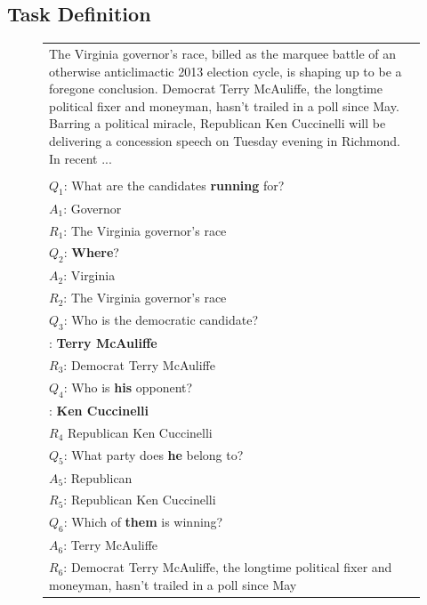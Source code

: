 \subsection{Task Definition}
\label{sec:coqa-task}

\begin{figure}[!t]
\begin{tabular}{p{\columnwidth}}
\toprule
The Virginia governor's race, billed as the marquee battle of an otherwise anticlimactic 2013 election cycle, is shaping up to be a foregone conclusion. Democrat Terry McAuliffe, the longtime political fixer and moneyman, hasn't trailed in a poll since May. Barring a political miracle, Republican Ken Cuccinelli will be delivering a concession speech on Tuesday evening in Richmond. In recent ...\\
\\
$Q_1$:               What are the candidates {\bf \color{magenta} running} for?\\
$A_1$:               Governor\\
$R_1$: The Virginia governor's race\\
\vspace{0em}
$Q_2$:               {\bf \color{magenta} Where}?\\
$A_2$:               Virginia \\
$R_2$: The Virginia governor's race\\
\vspace{0em}
$Q_3$:               Who is the democratic candidate?\\
\vspace{-0.6em}{\bf \color{blue} A$_3$}:               {\bf \color{orange} Terry McAuliffe} \\
$R_3$: Democrat Terry McAuliffe\\
\vspace{0em}
$Q_4$:               Who is {\bf \color{orange} his} opponent?\\
\vspace{-0.6em}{\bf \color{blue} A$_4$}:               {\bf \color{red} Ken Cuccinelli} \\
$R_4$ Republican Ken Cuccinelli\\
\vspace{0em}
$Q_5$:               What party does {\bf \color{red} he} belong to?\\
$A_5$:               Republican \\
$R_5$: Republican Ken Cuccinelli\\
\vspace{0em}
$Q_6$:               Which of {\bf \color{blue} them} is winning?\\
$A_6$:               Terry McAuliffe \\
$R_6$: Democrat Terry McAuliffe, the longtime political fixer and moneyman, hasn't trailed in a poll since May\\
\bottomrule
\end{tabular}
\end{figure}

